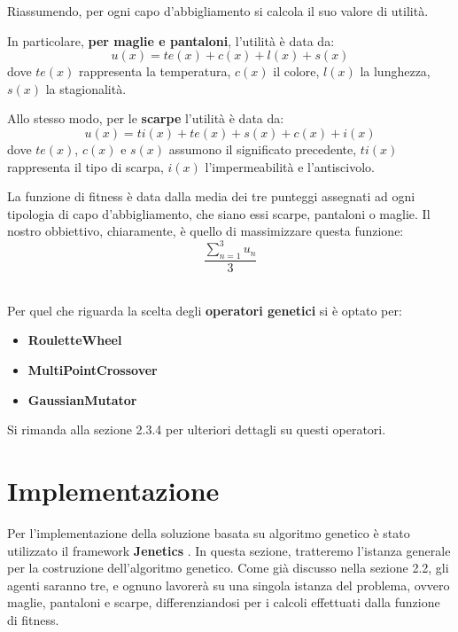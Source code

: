 \documentclass[a4paper, 11pt, oneside]{report}
\begin{document}
            \newpage
            \par \noindent Riassumendo, per ogni capo d'abbigliamento si calcola il suo valore di utilità.
            \\
            \par \noindent In particolare, \textbf{per maglie e pantaloni}, l'utilità è data da:
            \[
                u(x)=te(x)+c(x)+l(x)+s(x)
            \]
            dove $te(x)$ rappresenta la temperatura, $c(x)$ il colore, $l(x)$ la lunghezza, $s(x)$ la stagionalità.
            \\
            \par \noindent Allo stesso modo, per le \textbf{scarpe} l'utilità è data da:
            \[
                u(x)=ti(x)+te(x)+s(x)+c(x)+i(x)
            \]
            dove $te(x)$, $c(x)$ e $s(x)$ assumono il significato precedente, $ti(x)$ rappresenta il tipo di scarpa,
            $i(x)$ l'impermeabilità e l'antiscivolo.
            \\
            \par \noindent La funzione di fitness è data dalla media dei tre punteggi assegnati
            ad ogni tipologia di capo d'abbigliamento, che siano essi scarpe, pantaloni o maglie. Il nostro obbiettivo,
            chiaramente, è quello di massimizzare questa funzione:
            \[
                \frac{\sum_{n=1}^{3} u_{n}}{3}
            \]
            \\
            \par \noindent Per quel che riguarda la scelta degli \textbf{operatori genetici} si è optato per:
            \begin{itemize}
                \item \textbf{RouletteWheel}
                \item \textbf{MultiPointCrossover}
                \item \textbf{GaussianMutator}
            \end{itemize}
            Si rimanda alla sezione 2.3.4 per ulteriori dettagli su questi operatori.

            \newpage
            \section{Implementazione}
            Per l'implementazione della soluzione basata su algoritmo genetico è stato utilizzato il framework
            \textbf{Jenetics} \cite{1}. In questa sezione, tratteremo l'istanza generale per la costruzione dell'algoritmo
            genetico. Come già discusso nella sezione 2.2, gli agenti saranno tre, e ognuno lavorerà su una singola istanza
            del problema, ovvero maglie, pantaloni e scarpe, differenziandosi per i calcoli effettuati dalla funzione di
            fitness.
\end{document}
